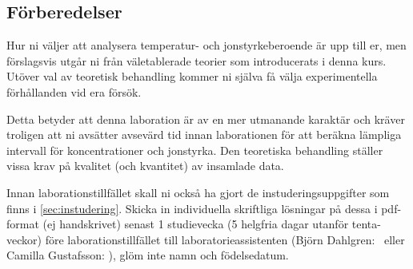 \subsection{Förberedelser}
Hur ni väljer att analysera temperatur- och jonstyrkeberoende är
upp till er, men förslagsvis utgår ni från väletablerade
teorier som introducerats i denna kurs. Utöver val av teoretisk behandling
kommer ni själva få välja experimentella förhållanden vid era försök.

Detta betyder att denna laboration är av en mer utmanande karaktär och
kräver troligen att ni avsätter avsevärd tid innan laborationen för att
beräkna lämpliga intervall för koncentrationer och jonstyrka.
Den teoretiska behandling ställer vissa krav på kvalitet (och
kvantitet) av insamlade data.

Innan laborationstillfället skall ni också ha gjort de
instuderingsuppgifter som finns i \cref{sec:instudering}. Skicka in
individuella skriftliga lösningar på dessa i pdf-format (ej handskrivet)
senast 1 studievecka (5 helgfria dagar utanför tenta-veckor) före
laborationstillfället till  laboratorieassistenten (Björn Dahlgren:
\mailtobjorn\ eller Camilla Gustafsson: \mailtocamilla), glöm inte namn
och födelsedatum.

